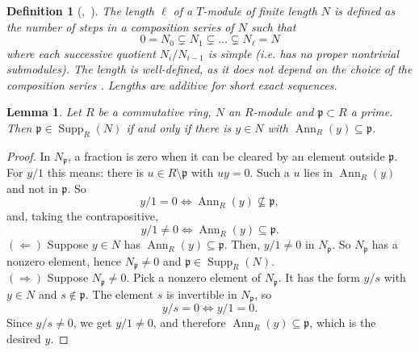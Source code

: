 \documentclass[pdflatex,sn-mathphys-num]{sn-jnl}
\numberwithin{equation}{section}
\theoremstyle{thmstyleone}
\newtheorem{lemma}[theorem]{Lemma}
\newtheorem{definition}[theorem]{Definition}
\theoremstyle{thmstyletwo}
\begin{document}
\begin{definition}[\mbox{\cite{coutinho, cohn}, \cite[Tags~02LY, 00J3, 00IV]{Stacks}}]\label{def:length}
    The length $\ell$ of a $T$-module of finite length $N$ is defined as the number of steps in a composition series of $N$ such that
    \[0 = N_0\subsetneq N_1\subsetneq \dots \subsetneq N_{\ell} = N\]
    where each successive quotient $N_i/N_{i-1}$ is simple (i.e. has no proper nontrivial submodules). The length is well-defined, as it does not depend on the choice of the composition series \cite[Tag 00J3]{Stacks}. Lengths are additive for short exact sequences.
\end{definition}
\begin{lemma}\label{lem:supp-criterion}
Let $R$ be a commutative ring, $N$ an $R$-module and $\mathfrak p\subset R$ a
prime. Then $\mathfrak p\in\operatorname{Supp}_R(N)$ if and only if there is
$y\in N$ with $\operatorname{Ann}_R(y)\subseteq\mathfrak p$.
\end{lemma}
\begin{proof}
In $N_{\mathfrak p}$, a
fraction is zero when it can be cleared by an element outside $\mathfrak p$.
For $y/1$ this means: there is $u\in R\setminus\mathfrak p$ with $uy=0$.
Such a $u$ lies in $\operatorname{Ann}_R(y)$ and not in $\mathfrak p$. So
\[y/1=0\iff\operatorname{Ann}_R(y)\not\subseteq\mathfrak p,\]
and, taking the contrapositive,
\[y/1\neq0\iff\operatorname{Ann}_R(y)\subseteq\mathfrak p.\]
\emph{$(\Leftarrow)$} Suppose $y\in N$ has
$\operatorname{Ann}_R(y)\subseteq\mathfrak p$. Then, $y/1\neq0$ in
$N_{\mathfrak p}$. So $N_{\mathfrak p}$ has a nonzero element, hence
$N_{\mathfrak p}\neq0$ and $\mathfrak p\in\operatorname{Supp}_R(N)$.\\
\emph{$(\Rightarrow)$} Suppose $N_{\mathfrak p}\neq0$. Pick a nonzero
element of $N_{\mathfrak p}$. It has the form $y/s$ with $y\in N$ and
$s\notin\mathfrak p$. The element $s$ is invertible in $N_{\mathfrak p}$, so
\[y/s=0\iff y/1=0.\]
Since $y/s\neq0$, we get $y/1\neq0$, and therefore
$\operatorname{Ann}_R(y)\subseteq\mathfrak p$, which is the desired $y$.
\end{proof}
\end{document}

